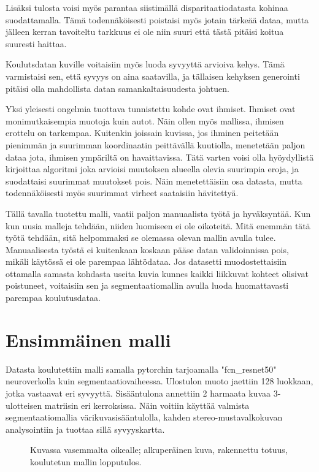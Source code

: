 Lisäksi tulosta voisi myös parantaa siistimällä disparitaatiodatasta kohinaa suodattamalla.
Tämä todennäköisesti poistaisi myös jotain tärkeää dataa,
mutta jälleen kerran tavoiteltu tarkkuus ei ole niin suuri että tästä pitäisi koitua suuresti haittaa.

Koulutsdatan kuville voitaisiin myös luoda syvyyttä arvioiva kehys.
Tämä varmistaisi sen, että syvyys on aina saatavilla, 
ja tällaisen kehyksen generointi pitäisi olla mahdollista datan samankaltaisuudesta johtuen.

Yksi yleisesti ongelmia tuottava tunnistettu kohde ovat ihmiset.
Ihmiset ovat monimutkaisempia muotoja kuin autot.
Näin ollen myös mallissa, ihmisen erottelu on tarkempaa.
Kuitenkin joissain kuvissa,
jos ihminen peitetään pienimmän ja suurimman koordinaatin peittävällä kuutiolla,
menetetään paljon dataa jota, ihmisen ympäriltä on havaittavissa.
Tätä varten voisi olla hyöydyllistä kirjoittaa algoritmi joka arvioisi muutoksen alueella olevia suurimpia eroja,
ja suodattaisi suurimmat muutokset pois. Näin menetettäisiin osa datasta,
mutta todennäköisesti myös suurimmat virheet saataisiin hävitettyä. 

Tällä tavalla tuotettu malli, vaatii paljon manuaalista työtä ja hyväksyntää.
Kun kun uusia malleja tehdään, niiden luomiseen ei ole oikoteitä.
Mitä enemmän tätä työtä tehdään,
sitä helpommaksi se olemassa olevan mallin avulla tulee.
Manuaalisesta työstä ei kuitenkaan koskaan pääse datan validoinnissa pois,
mikäli käytössä ei ole parempaa lähtödataa.
Jos datasetti muodostettaisiin ottamalla samasta kohdasta useita kuvia
kunnes kaikki liikkuvat kohteet olisivat poistuneet,
voitaisiin sen ja segmentaatiomallin avulla luoda huomattavasti parempaa koulutusdataa. 

\section{Ensimmäinen malli}

Datasta koulutettiin malli samalla pytorchin tarjoamalla "fcn\_resnet50" \cite{pytorchfcnresnet50} neuroverkolla kuin segmentaatiovaiheessa.
Ulostulon muoto jaettiin 128 luokkaan, jotka vastaavat eri syvyyttä.
Sisääntulona annettiin 2 harmaata kuvaa 3-ulotteisen matriisin eri kerroksissa.
Näin voitiin käyttää valmista segmentaatiomallia värikuvasisääntulolla, kahden stereo-mustavalkokuvan analysointiin ja tuottaa sillä syvyyskartta.

\begin{figure}[h]
\centering
{}
\caption{Kuvassa vasemmalta oikealle; alkuperäinen kuva, rakennettu totuus, koulutetun mallin lopputulos.}
\label{fig:model}
\end{figure}



